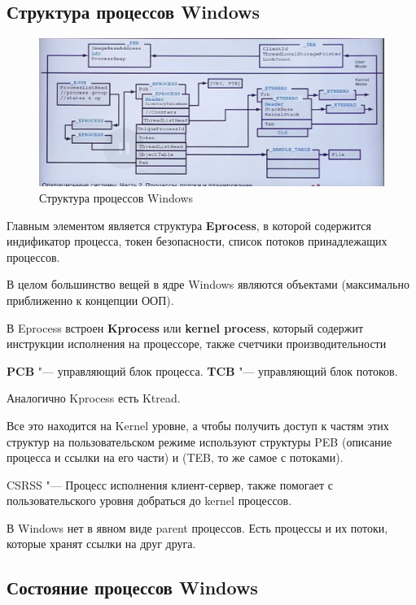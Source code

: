 \documentclass[bachelor, och, book]{SCWorks}
\theoremstyle{remark}
\begin{document}
    \subsection{Структура процессов Windows}

    \begin{figure}[H]
        \begin{center}
            \includegraphics[scale=0.40]{res/Windows-process-structure.png}
            \caption{Структура процессов Windows}
        \end{center}
    \end{figure}

    Главным элементом является структура \textbf{Eprocess}, в которой содержится индификатор процесса, токен безопасности, список потоков принадлежащих процессов.

    В целом большинство вещей в ядре Windows являются объектами (максимально приближенно к концепции ООП).

    В Eprocess встроен \textbf{Kprocess} или \textbf{kernel process}, который содержит инструкции исполнения на процессоре, также счетчики производительности

    \textbf{PCB} "--- управляющий блок процесса.
    \textbf{TCB} "--- управляющий блок потоков.

    Аналогично Kprocess есть Ktread. 

    Все это находится на Kernel уровне, а чтобы получить доступ к частям этих структур на пользовательском режиме используют структуры PEB (описание процесса и ссылки на его части) и (TEB, то же самое с потоками).

    CSRSS "--- Процесс исполнения клиент-сервер, также помогает с пользовательского уровня добраться до kernel процессов.

    В Windows нет в явном виде parent процессов. Есть процессы и их потоки, которые хранят ссылки на друг друга.


    \subsection{Состояние процессов Windows}
\end{document}
